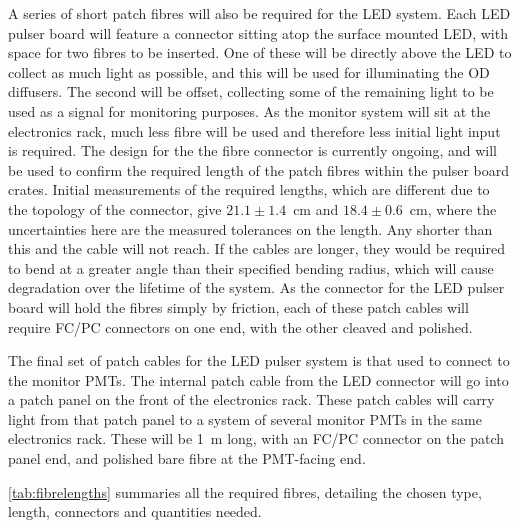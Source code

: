 \documentclass[a4paper,11pt]{article}
\begin{document}
A series of short patch fibres will also be required for the LED system. Each LED pulser board will feature a connector sitting atop the surface mounted LED, with space for two fibres to be inserted. One of these will be directly above the LED to collect as much light as possible, and this will be used for illuminating the OD diffusers. The second will be offset, collecting some of the remaining light to be used as a signal for monitoring purposes. As the monitor system will sit at the electronics rack, much less fibre will be used and therefore less initial light input is required. {\color{red} The design for the the fibre connector is currently ongoing, and will be used to confirm the required length of the patch fibres within the pulser board crates.} Initial measurements of the required lengths, which are different due to the topology of the connector, give $21.1\pm1.4$~cm and $18.4\pm0.6$~cm, where the uncertainties here are the measured tolerances on the length. Any shorter than this and the cable will not reach. If the cables are longer, they would be required to bend at a greater angle than their specified bending radius, which will cause degradation over the lifetime of the system. As the connector for the LED pulser board will hold the fibres simply by friction, each of these patch cables will require FC/PC connectors on one end, with the other cleaved and polished.

The final set of patch cables for the LED pulser system is that used to connect to the monitor PMTs. The internal patch cable from the LED connector will go into a patch panel on the front of the electronics rack. These patch cables will carry light from that patch panel to a system of several monitor PMTs in the same electronics rack. These will be 1~m long, with an FC/PC connector on the patch panel end, and polished bare fibre at the PMT-facing end.

\cref{tab:fibrelengths} summaries all the required fibres, detailing the chosen type, length, connectors and quantities needed.
\end{document}

